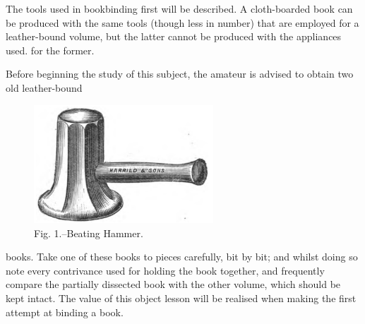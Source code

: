 \documentclass[twoside]{book}
\begin{document}
The tools used in bookbinding first will be described.
A cloth-boarded book can be produced
with the same tools (though less in number) that
are employed for a leather-bound volume, but the
latter cannot be produced with the appliances used.
for the former.

Before beginning the study of this subject, the
amateur is advised to obtain two old leather-bound
	\begin{figure}[h]
		\centering
		\includegraphics[width=0.6\textwidth]{Figures/_001.png}
		\caption*{Fig. 1.--Beating Hammer.}
	\end{figure}
books. Take one of these books to pieces carefully,
bit by bit; and whilst doing so note every
contrivance used for holding the book together, and
frequently compare the partially dissected book with
the other volume, which should be kept intact. The
value of this object lesson will be realised when
making the first attempt at binding a book.
\end{document}
